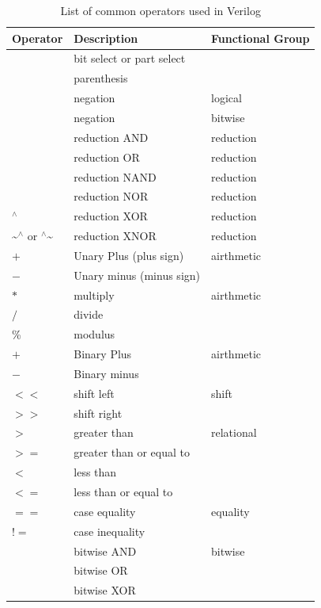 \documentclass[a4paper,10pt]{article}
\makeatletter
\def\zapcolorreset{\let\reset@color\relax\ignorespaces}
\def\colorrows#1{\noalign{\aftergroup\zapcolorreset#1}\ignorespaces}
\theoremstyle{mytheor}
\makeatother
\begin{document}
\begin{table}[h]
  \begin{center}
    \label{Table:operators-table}
    \caption{List of common operators used in Verilog}
    \renewcommand{\arraystretch}{1.1}
    \begin{tabularx}{.8\textwidth}{|X|X|X|} 
      \hline
      \rowcolor{greatblue}
      \color{white}  Operator & \color{white}Description & \color{white}Functional Group \\
      \hline
      \text{[]} & bit select or part select &  \\
      
      \hline
      \text{()} & parenthesis &  \\
      
      \hline
      \text{!} & negation &  logical\\
      \text{\textasciitilde} & negation &  bit\-wise\\
      \text{\&} & reduction AND & reduction \\
      \text{\textbar} & reduction OR & reduction \\
      \text{\textasciitilde\&} & reduction NAND & reduction \\
      \text{\textasciitilde\textbar} & reduction NOR & reduction \\
      $^\wedge$ & reduction XOR & reduction \\
      \textasciitilde$^\wedge$ or $^\wedge$\textasciitilde & reduction XNOR & reduction \\
      \hline
      $+$ & Unary Plus (plus sign) & airthmetic \\
      $-$ & Unary minus (minus sign) & \\
      \hline
      $*$ & multiply & airthmetic \\
      $/$ & divide &  \\
      \% & modulus &  \\
      \hline
      $+$ & Binary Plus & airthmetic \\
      $-$ & Binary minus &  \\
      \hline
      $<<$ & shift left & shift \\
      $>>$ & shift right &  \\
      \hline
      $>$ & greater than & relational \\
      $>=$  & greater than or equal to & \\
      $<$ & less than  & \\
      $<=$ & less than or equal to & \\
      \hline  
      $==$ & case equality & equality \\
      $!=$  & case inequality & \\
      \hline
      \text{\&} & bitwise AND & bitwise \\
      \text{\textbar} & bitwise OR & \\
      \text{\textasciitilde} & bitwise XOR & \\
      \hline
    \end{tabularx}
  \end{center}
\end{table}
\end{document}
